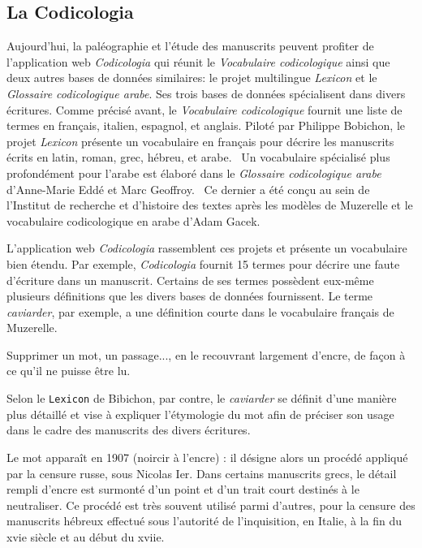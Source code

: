 \documentclass[class=article, crop=false]{standalone}
\begin{document}
\subsection{La Codicologia}

Aujourd'hui, la paléographie et l'étude des manuscrits peuvent profiter de l'application web \textit{Codicologia} qui réunit le \textit{Vocabulaire codicologique} ainsi que deux autres bases de données similaires: le projet multilingue \textit{Lexicon} et le \textit{Glossaire codicologique arabe}. Ses trois bases de données spécialisent dans divers écritures. Comme précisé avant, le \textit{Vocabulaire codicologique} fournit une liste de termes en français, italien, espagnol, et anglais. Piloté par Philippe Bobichon, le projet \textit{Lexicon} présente un vocabulaire en français pour décrire les manuscrits écrits en latin, roman, grec, hébreu, et arabe.~\cite{bobichon_lexicon_2009} Un vocabulaire spécialisé plus profondément pour l'arabe est élaboré dans le \textit{Glossaire codicologique arabe} d'Anne-Marie Eddé et Marc Geoffroy.~\cite{noauthor_glossaire_2002} Ce dernier a été conçu au sein de l'Institut de recherche et d'histoire des textes après les modèles de Muzerelle et le vocabulaire codicologique en arabe d'Adam Gacek.~\cite{gacek_arabic_2001}

L'application web \textit{Codicologia} rassemblent ces projets et présente un vocabulaire bien étendu. Par exemple, \textit{Codicologia} fournit 15 termes pour décrire une faute d'écriture dans un manuscrit. Certains de ses termes possèdent eux-même plusieurs définitions que les divers bases de données fournissent. Le terme \textit{caviarder}, par exemple, a une définition courte dans le vocabulaire français de Muzerelle. 

\begin{displayquote}
Supprimer un mot, un passage..., en le recouvrant largement d'encre, de façon à ce qu'il ne puisse être lu.~\cite{muzerelle_caviarder_2011}
\end{displayquote}

\noindent Selon le \texttt{Lexicon} de Bibichon, par contre, le \textit{caviarder} se définit d'une manière plus détaillé et vise à expliquer l'étymologie du mot afin de préciser son usage dans le cadre des manuscrits des divers écritures.

\begin{displayquote}
Le mot apparaît en 1907 (noircir à l'encre) : il désigne alors un procédé appliqué par la censure russe, sous Nicolas Ier. Dans certains manuscrits grecs, le détail rempli d'encre est surmonté d'un point et d'un trait court destinés à le neutraliser. Ce procédé est très souvent utilisé parmi d'autres, pour la censure des manuscrits hébreux effectué sous l'autorité de l'inquisition, en Italie, à la fin du xvie siècle et au début du xviie.~\cite{bobichon_caviarder_2011}


\end{displayquote}
\end{document}
